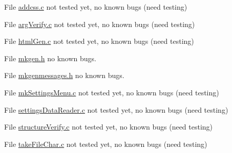 
\begin{DoxyRefList}
\item[File \mbox{\hyperlink{addcss_8c}{addcss.c}} ]\label{bug__bug000001}%
%
not tested yet, no known bugs (need testing)  
\item[File \mbox{\hyperlink{argVerify_8c}{arg\+Verify.c}} ]\label{bug__bug000002}%
%
not tested yet, no known bugs (need testing)  
\item[File \mbox{\hyperlink{htmlGen_8c}{html\+Gen.c}} ]\label{bug__bug000003}%
%
not tested yet, no known bugs (need testing) 
\item[File \mbox{\hyperlink{mkgen_8h}{mkgen.h}} ]\label{bug__bug000004}%
%
no known bugs.  
\item[File \mbox{\hyperlink{mkgenmessages_8h}{mkgenmessages.h}} ]\label{bug__bug000009}%
%
no known bugs.  
\item[File \mbox{\hyperlink{mkSettingsMenu_8c}{mk\+Settings\+Menu.c}} ]\label{bug__bug000005}%
%
not tested yet, no known bugs (need testing)  
\item[File \mbox{\hyperlink{settingsDataReader_8c}{settings\+Data\+Reader.c}} ]\label{bug__bug000006}%
%
not tested yet, no known bugs (need testing)  
\item[File \mbox{\hyperlink{structureVerify_8c}{structure\+Verify.c}} ]\label{bug__bug000007}%
%
not tested yet, no known bugs (need testing)  
\item[File \mbox{\hyperlink{takeFileChar_8c}{take\+File\+Char.c}} ]\label{bug__bug000008}%
%
not tested yet, no known bugs (need testing) 
\end{DoxyRefList}